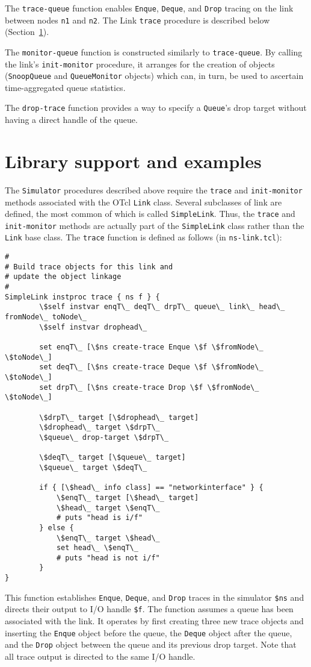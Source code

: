 The {\tt trace-queue} function enables
{\tt Enque}, {\tt Deque}, and {\tt Drop} tracing on the link
between nodes {\tt n1} and {\tt n2}.
The Link {\tt trace} procedure is described below (Section~\ref{sec:libexam}).

The {\tt monitor-queue} function is constructed similarly to
{\tt trace-queue}.
By calling the link's {\tt init-monitor} procedure, it arranges
for the creation of objects ({\tt SnoopQueue} and {\tt QueueMonitor}
objects) which can, in turn, be used to ascertain time-aggregated
queue statistics.

The {\tt drop-trace} function provides a way to specify a
{\tt Queue}'s drop target without having a direct handle of
the queue.

\section{Library support and examples}
\label{sec:libexam}

The {\tt Simulator} procedures described above require the {\tt trace}
and {\tt init-monitor} methods associated with the OTcl {\tt Link} class.
Several subclasses of link are defined, the most common of which
is called {\tt SimpleLink}.  Thus, the {\tt trace} and {\tt init-monitor}
methods are actually part of the {\tt SimpleLink} class rather than
the {\tt Link} base class.
The {\tt trace} function is defined as follows (in {\tt ns-link.tcl}):
\begin{verbatim}
#
# Build trace objects for this link and
# update the object linkage
#
SimpleLink instproc trace { ns f } {
        \$self instvar enqT\_ deqT\_ drpT\_ queue\_ link\_ head\_ fromNode\_ toNode\_
        \$self instvar drophead\_

        set enqT\_ [\$ns create-trace Enque \$f \$fromNode\_ \$toNode\_]
        set deqT\_ [\$ns create-trace Deque \$f \$fromNode\_ \$toNode\_]
        set drpT\_ [\$ns create-trace Drop \$f \$fromNode\_ \$toNode\_]

        \$drpT\_ target [\$drophead\_ target]
        \$drophead\_ target \$drpT\_
        \$queue\_ drop-target \$drpT\_

        \$deqT\_ target [\$queue\_ target]
        \$queue\_ target \$deqT\_

        if { [\$head\_ info class] == "networkinterface" } {
            \$enqT\_ target [\$head\_ target]
            \$head\_ target \$enqT\_
            # puts "head is i/f"
        } else {
            \$enqT\_ target \$head\_
            set head\_ \$enqT\_
            # puts "head is not i/f"
        }
}
\end{verbatim}
This function establishes {\tt Enque}, {\tt Deque}, and {\tt Drop}
traces in the simulator {\tt \$ns} and directs their
output to I/O handle {\tt \$f}.
The function assumes a queue has been associated with the link.
It operates by first creating three new trace objects
and inserting the {\tt Enque} object before the queue, the
{\tt Deque} object after the queue, and the {\tt Drop} object
between the queue and its previous drop target.
Note that all trace output is directed to the same I/O handle.

